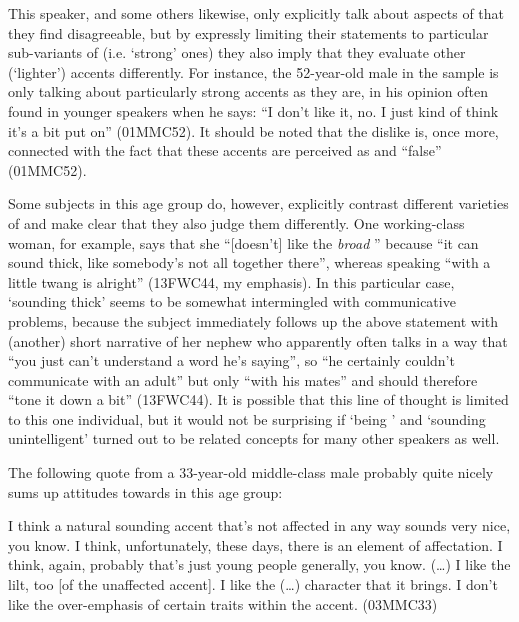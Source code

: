This speaker, and some others likewise, only explicitly talk about aspects of  that they find disagreeable, but by expressly limiting their statements to particular sub-variants of  (i.e. `strong' ones) they also imply that they evaluate other (`lighter') accents differently.
For instance, the 52-year-old male in the sample is only talking about particularly strong  accents as they are, in his opinion often found in younger speakers when he says: ``I don't like it, no. I just kind of think it's a bit put on'' (01MMC52).
It should be noted that the dislike is, once more, connected with the fact that these accents are perceived as  and ``false'' (01MMC52).

Some subjects in this age group do, however, explicitly contrast different varieties of  and make clear that they also judge them differently.
One working-class woman, for example, says that  she ``[doesn't] like the \emph{broad} '' because ``it can sound thick, like somebody's not all together there'', whereas speaking ``with a little twang is alright'' (13FWC44, my emphasis).
In this particular case, `sounding thick' seems to be somewhat intermingled with communicative problems, because the subject immediately follows up the above statement with (another) short narrative of her nephew who apparently often talks in a way that ``you just can't understand a word he's saying'', so ``he certainly couldn't communicate with an adult'' but only ``with his mates'' and should therefore ``tone it down a bit'' (13FWC44).
It is possible that this line of thought is limited to this one individual, but it would not be surprising if `being ' and `sounding unintelligent' turned out to be related concepts for many other speakers as well.

The following quote from a 33-year-old middle-class male probably quite nicely sums up attitudes towards  in this age group:
\begin{example}
	I think a natural sounding  accent that's not affected in any way sounds very nice, you know.
	I think, unfortunately, these days, there is an element of affectation.
	I think, again, probably that's just young people generally, you know.
	(\ldots) I like the lilt, too [of the unaffected accent].
	I like the (\ldots) character that it brings.
	I don't like the over-emphasis of certain traits within the accent. (03MMC33)
\end{example}

